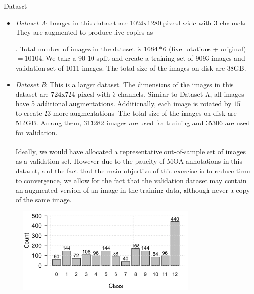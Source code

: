 \begin{section}{Dataset}
	\begin{itemize}
		\item \textit{Dataset A}: Images in this dataset are 1024x1280 pixesl wide with 3 channels. They are augmented to produce five copies as
		. Total number of images in the dataset is $1684*6$ (five rotations + original) $= 10104$. We take a 90-10 split and create a training set of 9093 images and validation set of 1011 images. The total size of the images on disk are 38GB. 
		\item
		\textit{Dataset B}: This is a larger dataset. The dimensions of the images in this dataset are 724x724 pixesl with 3 channels. Similar to Dataset A, all images have 5 additional augmentations. Additionally, each image is rotated by $15^{\circ}$ to create 23 more augmentations. The total size of the images on disk are  512GB. Among them, 313282 images are used for training and 35306 are used for validation. \\\\
\noindent Ideally, we would have allocated a representative out-of-sample set of images as a validation set. However due to the paucity of MOA annotations in this dataset, and the fact that the main objective of this exercise is to reduce time to convergence, we allow for the fact that the validation dataset may contain an augmented version of an image in the training data, although never a copy of the same image. 
	\end{itemize}
	\begin{figure}[h]
	  \centering	
	    \includegraphics[width=3.5in]
	    {wgrid_figure2.png}

\end{figure}
\end{section}
